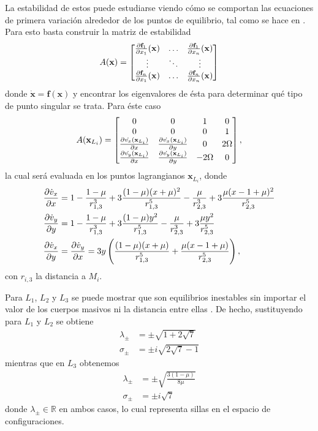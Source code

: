 
La estabilidad de estos puede estudiarse viendo cómo se comportan las ecuaciones de primera variación alrededor de los puntos de equilibrio, tal como se hace en \cite{Cornish1998}. Para esto basta construir la matriz de estabilidad 
\begin{equation*}
 A(\mathbf{x}) = \begin{bmatrix}
  \frac{\partial \mathbf{f}_1}{\partial x_1}(\mathbf{x}) & \dots & \frac{\partial \mathbf{f}_1}{\partial x_n}(\mathbf{x}) \\
  \vdots & \ddots & \vdots \\ 
  \frac{\partial \mathbf{f}_n}{\partial x_1}(\mathbf{x}) & \dots & \frac{\partial \mathbf{f}_n}{\partial x_n} (\mathbf{x})
\end{bmatrix}
\end{equation*}
donde $\dot{\mathbf{x}} = \mathbf{f}(\mathbf{x})$ y encontrar los eigenvalores de ésta para determinar qué tipo de punto singular se trata. Para éste caso
\begin{equation}
 A(\mathbf{x}_{L_i}) = \begin{bmatrix}
  0 & 0 & 1 & 0 \\
  0 & 0 & 0 & 1 \\ 
  \frac{\partial \dot{v_x}(\mathbf{x}_{L_i})}{\partial x} & \frac{\partial \dot{v_x}(\mathbf{x}_{L_i})}{\partial y} & 0 & 2 \Omega \\
  \frac{\partial \dot{v_y}(\mathbf{x}_{L_i})}{\partial x} & \frac{\partial \dot{v_y}(\mathbf{x}_{L_i})}{\partial y} & -2\Omega & 0
\end{bmatrix},
\label{eq:stability_CR3BP}
\end{equation}
la cual será evaluada en los puntos lagrangianos $\mathbf{x}_{L_i}$, donde 
\begin{align}
 \frac{\partial \dot{v}_x}{\partial x} &=  1 - \frac{1-\mu}{r_{1,3}^3} + 3\frac{(1-\mu)(x + \mu)^2}{r_{1,3}^5} - \frac{\mu}{r_{2,3}^3} + 3\frac{\mu(x - 1 + \mu)^2}{r_{2,3}^5} \nonumber \\ 
 \frac{\partial \dot{v}_y}{\partial y} &= 1 - \frac{1-\mu}{r_{1,3}^3} + 3\frac{(1-\mu)y^2}{r_{1,3}^5} - \frac{\mu}{r_{2,3}^3} + 3\frac{\mu y^2}{r_{2,3}^5} \nonumber \\
 \frac{\partial \dot{v}_x}{\partial y} &= \frac{\partial \dot{v}_y}{\partial x} = 3 y \left( \frac{(1-\mu)(x+\mu)}{r_{1,3}^5} + \frac{\mu (x - 1 + \mu)}{r_{2,3}^5} \right),
 \label{eq:3body_stability}
\end{align}
con $r_{i,3}$ la distancia a $M_i$.

Para $L_1$, $L_2$ y $L_3$ se puede mostrar que son equilibrios inestables sin importar el valor de los cuerpos masivos ni la distancia entre ellas \cite{MirelesJames2006}. De hecho, sustituyendo para $L_1$ y $L_2$ se obtiene
\begin{align*}
 \lambda_\pm &= \pm  \sqrt{1 + 2\sqrt{7}} \\
 \sigma_\pm &= \pm i \sqrt{2\sqrt{7} - 1}
\end{align*}
mientras que en $L_3$ obtenemos 
\begin{align*}
 \lambda_\pm &= \pm \sqrt{ \frac{3(1 - \mu)}{8\mu} } \\
 \sigma_\pm &= \pm i \sqrt{7}
\end{align*}
donde $\lambda_\pm \in \mathbb{R}$ en ambos casos, lo cual representa sillas en el espacio de configuraciones.

